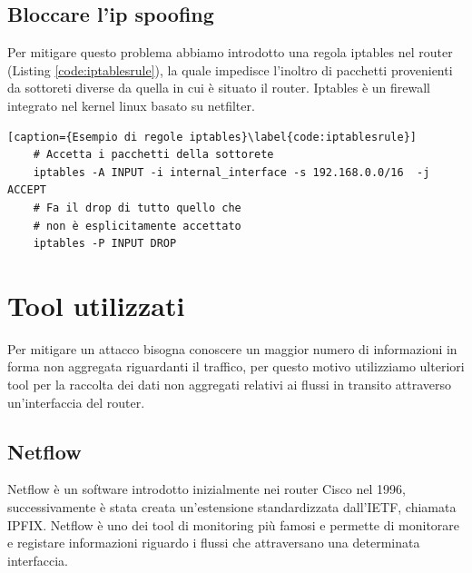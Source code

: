 \subsection{Bloccare l'ip spoofing}
Per mitigare questo problema abbiamo introdotto una regola iptables nel router (Listing \ref{code:iptablesrule}), la quale impedisce l'inoltro di pacchetti provenienti da sottoreti diverse da quella in cui è situato il router.
Iptables è un firewall integrato nel kernel linux basato su netfilter.

\begin{lstlisting}[caption={Esempio di regole iptables}\label{code:iptablesrule}]
    # Accetta i pacchetti della sottorete
    iptables -A INPUT -i internal_interface -s 192.168.0.0/16  -j ACCEPT
    # Fa il drop di tutto quello che
    # non è esplicitamente accettato
    iptables -P INPUT DROP
\end{lstlisting}


\section{Tool utilizzati}

Per mitigare un attacco bisogna conoscere un maggior numero di informazioni in forma non aggregata riguardanti il traffico, per questo motivo utilizziamo ulteriori tool per la raccolta dei dati non aggregati relativi ai flussi in transito attraverso un'interfaccia del router.

\subsection{Netflow}

Netflow è un software introdotto inizialmente nei router Cisco nel 1996, successivamente è stata creata un'estensione standardizzata dall'IETF, chiamata IPFIX. Netflow è uno dei tool di monitoring più famosi e permette di monitorare e registare informazioni riguardo i flussi che attraversano una determinata interfaccia.




